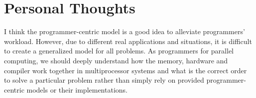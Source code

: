 \documentclass[10pt, letterpaper]{article}
\begin{document}
\section{Personal Thoughts}
\label{sec-thoughts}
I think the programmer-centric model is a good idea to alleviate programmers' workload. However, due to different real applications and situations, it is difficult to create a generalized model for all problems. As programmers for parallel computing, we should deeply understand how the memory, hardware and compiler work together in multiprocessor systems and what is the correct order to solve a particular problem rather than simply rely on provided programmer-centric models or their implementations. 



\end{document}
